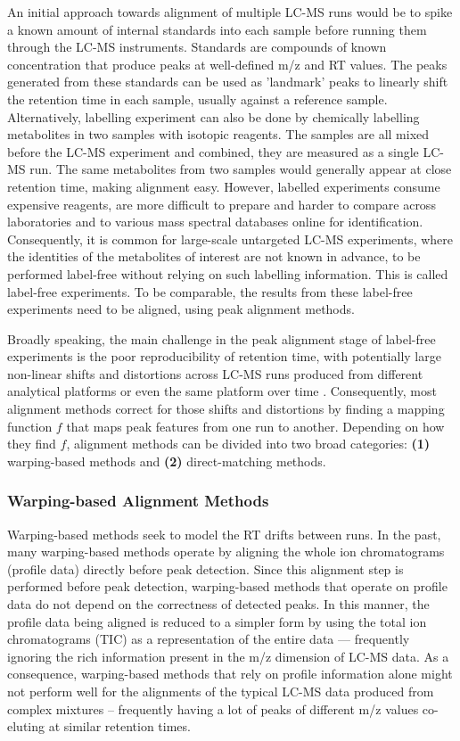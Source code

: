 An initial approach towards alignment of multiple LC-MS runs  would be to spike a known amount of internal standards into each sample before running them through the LC-MS instruments. Standards are compounds of known concentration that produce peaks at well-defined m/z and RT values. The peaks generated from these standards can be used as 'landmark' peaks to linearly shift the retention time in each sample, usually against a reference sample. Alternatively, labelling experiment can also be done by chemically labelling metabolites in two samples with isotopic reagents. The samples are all mixed before the LC-MS experiment and combined, they are measured as a single LC-MS run. The same metabolites from two samples would generally appear at close retention time, making alignment easy. However, labelled experiments consume expensive reagents, are more difficult to prepare and harder to compare across laboratories and to various mass spectral databases online for identification. Consequently, it is common for large-scale untargeted LC-MS experiments, where the identities of the metabolites of interest are not known in advance, to be performed label-free without relying on such labelling information. This is called label-free experiments. To be comparable, the results from these label-free experiments need to be aligned, using peak alignment methods.

Broadly speaking, the main challenge in the peak alignment stage of label-free experiments is the poor reproducibility of retention time, with potentially large non-linear shifts and distortions across LC-MS runs produced from different analytical platforms or even the same platform over time \cite{podwojski2009retention}. Consequently, most alignment methods correct for those shifts and distortions by finding a mapping function $f$ that maps peak features from one run to another. Depending on how they find $f$, alignment methods can be divided into two broad categories: \textbf{(1)} warping-based methods and \textbf{(2)} direct-matching methods.

\subsubsection{Warping-based Alignment Methods}

Warping-based methods seek to model the RT drifts between runs. In the past, many warping-based methods operate by aligning the whole ion chromatograms (profile data) directly before peak detection. Since this alignment step is performed before peak detection, warping-based methods that operate on profile data do not depend on the correctness of detected peaks. In this manner, the profile data being aligned is reduced to a simpler form by using the total ion chromatograms (TIC) as a representation of the entire data --- frequently ignoring the rich information present in the m/z dimension of LC-MS data. As a consequence, warping-based methods that rely on profile information alone might not perform well for the alignments of the typical LC-MS data produced from complex mixtures -- frequently having a lot of peaks of different m/z values co-eluting at similar retention times. 

